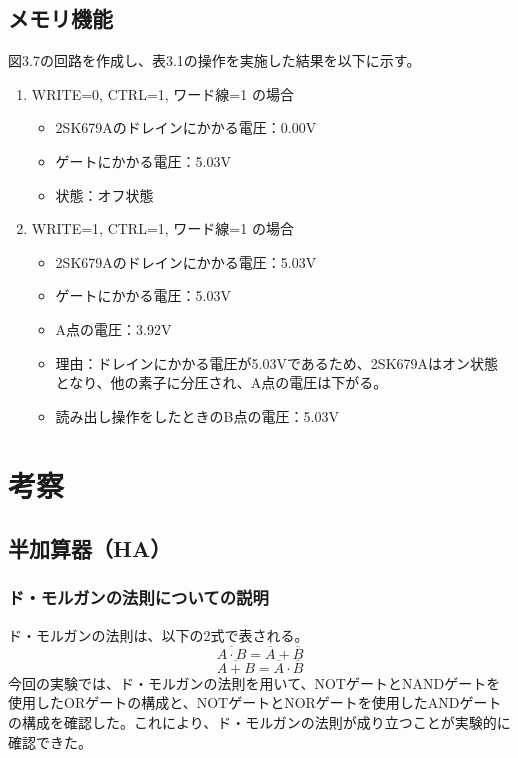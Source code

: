 \documentclass{jlreq}
\numberwithin{equation}{section}
\begin{document}
\subsection{メモリ機能}
図3.7の回路を作成し、表3.1の操作を実施した結果を以下に示す。
\begin{enumerate}
  \item WRITE=0, CTRL=1, ワード線=1 の場合
  \begin{itemize}
    \item 2SK679Aのドレインにかかる電圧：0.00V
    \item ゲートにかかる電圧：5.03V
    \item 状態：オフ状態
  \end{itemize}
  \item WRITE=1, CTRL=1, ワード線=1 の場合
  \begin{itemize}
    \item 2SK679Aのドレインにかかる電圧：5.03V
    \item ゲートにかかる電圧：5.03V
    \item A点の電圧：3.92V
    \item 理由：ドレインにかかる電圧が5.03Vであるため、2SK679Aはオン状態となり、他の素子に分圧され、A点の電圧は下がる。
    \item 読み出し操作をしたときのB点の電圧：5.03V
  \end{itemize}
\end{enumerate}

\section{考察}

\subsection{半加算器（HA）}
\subsubsection{ド・モルガンの法則についての説明}
ド・モルガンの法則は、以下の2式で表される。
\begin{equation}
  \overline{A \cdot B} = \overline{A} + \overline{B}
\end{equation}
\begin{equation}
  \overline{A + B} = \overline{A} \cdot \overline{B}
\end{equation}
今回の実験では、ド・モルガンの法則を用いて、NOTゲートとNANDゲートを使用したORゲートの構成と、NOTゲートとNORゲートを使用したANDゲートの構成を確認した。これにより、ド・モルガンの法則が成り立つことが実験的に確認できた。
\end{document}
